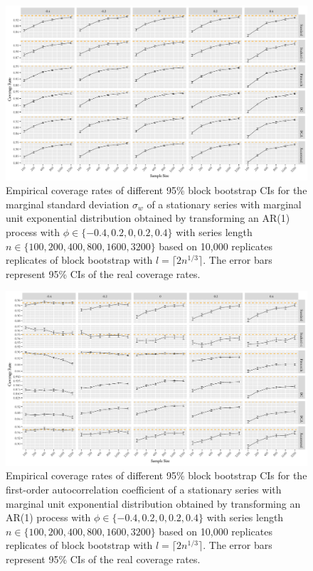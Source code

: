 \documentclass[12pt]{article}
\newcommand{\eds}[1]{\textcolor{blue}{(EDS: #1)}}
\newcommand{\mc}[1]{\textcolor{green}{(MC: #1)}}
\begin{document}
\begin{figure}[tbp]
  \centering
  \includegraphics[width=\textwidth]{figures/plot_exp_sigma_2}
  \caption{Empirical coverage rates of different 95\% block bootstrap CIs for
    the marginal standard deviation $\sigma_w$ %
    of a stationary series with 
    marginal unit exponential distribution obtained by transforming an AR(1) process
    with $\phi \in \{-0.4, 0.2, 0, 0.2, 0.4\}$ with series length 
    $n \in \{100, 200, 400, 800, 1600, 3200\}$ based on 10,000 replicates 
    replicates of
    block bootstrap with $l = \lceil 2n^{1/3} \rceil$. 
    The error bars represent 95\% CIs of the real coverage rates.}
  \label{fig:exp_sigma2}
\end{figure}


\begin{figure}[tbp]
  \centering
  \includegraphics[width=\textwidth]{figures/plot_exp_phi_2}
  \caption{Empirical coverage rates of different 95\% block bootstrap CIs for 
    the first-order autocorrelation coefficient of a stationary series
    with marginal unit exponential distribution obtained by transforming an AR(1) 
    process with 
    $\phi \in \{-0.4, 0.2, 0, 0.2, 0.4\}$ with series length
    $n \in \{100, 200, 400, 800, 1600, 3200\}$ based on 10,000 replicates 
    replicates of
    block bootstrap with $l = \lceil 2n^{1/3} \rceil$. 
    The error bars represent 95\% CIs of the real coverage rates.}
  \label{fig:exp_phi2}
\end{figure}
\end{document}
